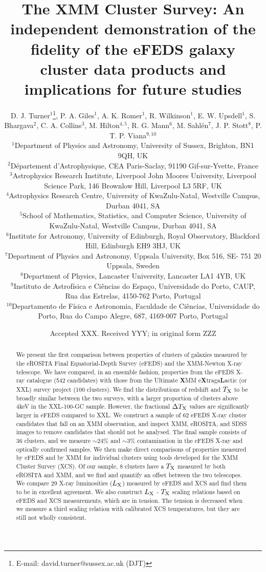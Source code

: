 \documentclass[fleqn,usenatbib]{mnras}
\title[XCS: Demonstrating the fidelity of eFEDS data products when applied to clusters of galaxies]{The XMM Cluster Survey: An independent demonstration of the fidelity of the eFEDS galaxy cluster data products and implications for future studies}
\author[D. J. Turner et al.]
{D. J. Turner$^{1}$\thanks{E-mail: david.turner@sussex.ac.uk (DJT)}\orcidA{},
P. A. Giles$^{1}$\orcidB{},
A. K. Romer$^{1}$\orcidC{},
R. Wilkinson$^{1}$\orcidD{},
E. W. Upsdell$^{1}$\orcidG{},
S. Bhargava$^{2}$,
\newauthor
C. A. Collins$^{3}$,
M. Hilton$^{4,5}$\orcidJ{},
R. G. Mann$^{6}$\orcidH{},
M. Sahl\'en$^{7}$\orcidI{},
J. P. Stott$^{8}$\orcidF{},
P. T. P. Viana$^{9,10}$\orcidE{}
\\
$^{1}$Department of Physics and Astronomy, University of Sussex, Brighton, BN1 9QH, UK\\
$^{2}$Département d’Astrophysique, CEA Paris-Saclay, 91190 Gif-sur-Yvette, France\\
$^{3}$Astrophysics Research Institute, Liverpool John Moores University, Liverpool Science Park, 146 Brownlow Hill, Liverpool L3 5RF, UK \\
$^{4}$Astrophysics Research Centre, University of KwaZulu-Natal, Westville Campus, Durban 4041, SA \\
$^{5}$School of Mathematics, Statistics, and Computer Science, University of KwaZulu-Natal, Westville Campus, Durban 4041, SA \\
$^{6}$Institute for Astronomy, University of Edinburgh, Royal Observatory, Blackford Hill, Edinburgh EH9 3HJ, UK \\
$^{7}$Department of Physics and Astronomy, Uppsala University, Box 516, SE- 751 20 Uppsala, Sweden\\
$^{8}$Department of Physics, Lancaster University, Lancaster LA1 4YB, UK \\
$^{9}$Instituto de Astrof\'isica e Ci\^{e}ncias do Espa\c co, Universidade do Porto, CAUP, Rua das Estrelas, 4150-762 Porto, Portugal \\
$^{10}$Departamento de F\'isica e Astronomia, Faculdade de Ci\^{e}ncias, Universidade do Porto, Rua do Campo Alegre, 687, 4169-007 Porto, Portugal \\
}
\date{Accepted XXX. Received YYY; in original form ZZZ}
\begin{document}
\label{firstpage}
\pagerange{\pageref{firstpage}--\pageref{lastpage}}
\maketitle

\begin{abstract}
We present the first comparison between properties of clusters of galaxies measured by the eROSITA Final Equatorial-Depth Survey (eFEDS) and the XMM-Newton X-ray telescope. We have compared, in an ensemble fashion, properties from the eFEDS X-ray catalogue (542 candidates) with those from the Ultimate {\bf X}MM e{\bf X}traga{\bf L}actic (or XXL) survey project (100 clusters). We find the distributions of redshift and $T_{\rm X}$ to be broadly similar between the two surveys, with a larger proportion of clusters above 4keV in the XXL-100-GC sample. However, the fractional $\Delta T_{\rm X}$ values are significantly larger in eFEDS compared to XXL.
We construct a sample of 62 eFEDS X-ray cluster candidates that fall on an XMM observation, and inspect XMM, eROSITA, and SDSS images to remove candidates that should not be analysed. The final sample consists of 36 clusters, and we measure ${\sim}$24\% and ${\sim}$3\% contamination in the eFEDS X-ray and optically confirmed samples.
We then make direct comparisons of properties measured by eFEDS and by XMM for individual clusters using tools developed for the XMM Cluster Survey (XCS). Of our sample, 8 clusters have a $T_{\rm X}$ measured by both eROSITA and XMM, and we find and quantify an offset between the two telescopes. We compare 29 X-ray luminosities ($L_{\rm X}$) measured by eFEDS and XCS and find them to be in excellent agreement.  We also construct $L_{\rm X}$ - $T_{\rm X}$ scaling relations based on eFEDS and XCS measurements, which are in tension. The tension is decreased when we measure a third scaling relation with calibrated XCS temperatures, but they are still not wholly consistent.

\end{abstract}
\end{document}
